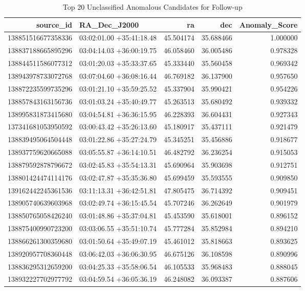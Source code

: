 \begin{table}
\caption{Top 20 Unclassified Anomalous Candidates for Follow-up}
\label{tab:anomalies}
\begin{tabular}{rlrrr}
\toprule
source_id & RA_Dec_J2000 & ra & dec & Anomaly_Score \\
\midrule
138851516677358336 & 03:02:01.00 +35:41:18.48 & 45.504174 & 35.688466 & 1.000000 \\
138837188665895296 & 03:04:14.03 +36:00:19.75 & 46.058460 & 36.005486 & 0.978328 \\
138844511586077312 & 03:01:20.03 +35:33:37.65 & 45.333440 & 35.560458 & 0.969342 \\
138943978733072768 & 03:07:04.60 +36:08:16.44 & 46.769182 & 36.137900 & 0.957650 \\
138872235599735296 & 03:01:21.10 +35:59:25.52 & 45.337904 & 35.990421 & 0.954226 \\
138857843163156736 & 03:01:03.24 +35:40:49.77 & 45.263513 & 35.680492 & 0.939332 \\
138995831873415680 & 03:04:54.81 +36:36:15.95 & 46.228393 & 36.604431 & 0.927343 \\
137341681053950592 & 03:00:43.42 +35:26:13.60 & 45.180917 & 35.437111 & 0.921479 \\
138839495064504448 & 03:01:22.86 +35:27:24.79 & 45.345251 & 35.456886 & 0.918677 \\
138937759620665088 & 03:05:55.87 +36:14:10.51 & 46.482792 & 36.236254 & 0.915053 \\
138879592878796672 & 03:02:45.83 +35:54:13.31 & 45.690964 & 35.903698 & 0.912751 \\
138801424474114176 & 03:02:47.87 +35:35:36.80 & 45.699459 & 35.593555 & 0.909850 \\
139162442245361536 & 03:11:13.31 +36:42:51.81 & 47.805475 & 36.714392 & 0.909451 \\
138905740639603968 & 03:02:49.74 +36:15:45.54 & 45.707246 & 36.262649 & 0.901979 \\
138850765058426240 & 03:01:48.86 +35:37:04.81 & 45.453590 & 35.618001 & 0.896152 \\
138875400990723200 & 03:03:06.55 +35:51:10.74 & 45.777284 & 35.852984 & 0.894210 \\
138866261300359680 & 03:01:50.64 +35:49:07.19 & 45.461012 & 35.818663 & 0.893625 \\
138920957708360448 & 03:06:42.03 +36:06:30.95 & 46.675126 & 36.108598 & 0.890996 \\
138836295312659200 & 03:04:25.33 +35:58:06.54 & 46.105533 & 35.968483 & 0.888045 \\
138932227702977792 & 03:04:59.54 +36:05:36.19 & 46.248082 & 36.093387 & 0.887606 \\
\bottomrule
\end{tabular}
\end{table}
